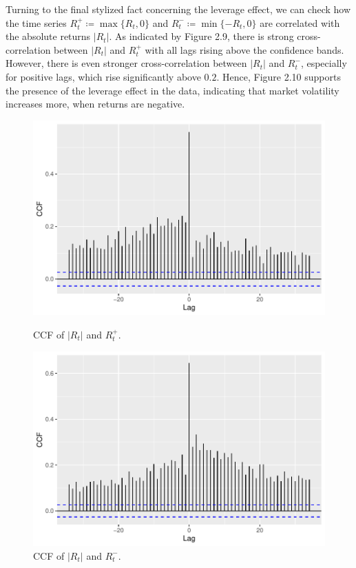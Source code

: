 Turning to the final stylized fact concerning the leverage effect, we can check how the time series $R^{+}_{t}\coloneqq \max\{ R_{t},0\}$ and $R^{-}_{t}\coloneqq \min\{-R_{t},0\}$ are correlated with the absolute returns $|R_{t}|$. As indicated by Figure 2.9, there is strong cross-correlation between $|R_{t}|$ and $R^{+}_{t}$ with all lags rising above the confidence bands. However, there is even stronger cross-correlation between $|R_{t}|$ and $R^{-}_{t}$, especially for positive lags, which rise significantly above $0.2$. Hence, Figure 2.10 supports the presence of the leverage effect in the data, indicating that market volatility increases more, when returns are negative.
\begin{figure}[H]
\begin{minipage}[b]{0.45\linewidth}
\centering
\includegraphics[width=1.2\linewidth, height=0.3\textheight]{fig/img/ccfmaxRny.pdf}
\caption{CCF of $|R_{t}|$ and $R^{+}_{t}$.}
\label{fig:ACF1}
\end{minipage}
\hspace{0.7cm}
\begin{minipage}[b]{0.45\linewidth}
\centering
\includegraphics[width=1.2\linewidth, height=0.3\textheight]{fig/img/ccfminusR.pdf}
\caption{CCF of $|R_{t}|$ and $R^{-}_{t}$.}
\label{fig:ACF2}
\end{minipage}
\end{figure}
